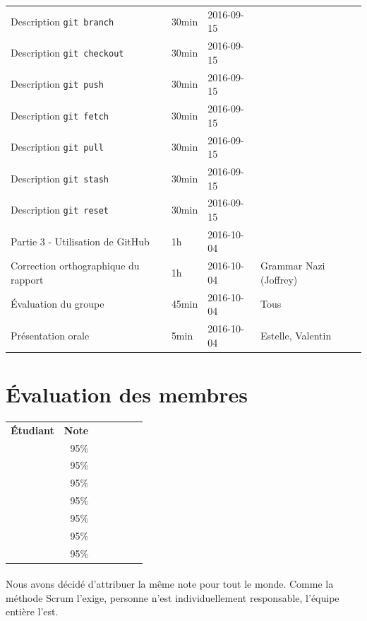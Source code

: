 \documentclass[11pt,canadien]{article}
\begin{document}
\begin{appendices}
\begin{tabular}{l l l l}
	\\ Description \texttt{git branch}      & 30min & 2016-09-15 & \karen
	\\ Description \texttt{git checkout}    & 30min & 2016-09-15 & \karen
	\\ Description \texttt{git push}        & 30min & 2016-09-15 & \kevin
	\\ Description \texttt{git fetch}       & 30min & 2016-09-15 & \kevin
	\\ Description \texttt{git pull}        & 30min & 2016-09-15 & \kevin
	\\ Description \texttt{git stash}       & 30min & 2016-09-15 & \antoine
	\\ Description \texttt{git reset}       & 30min & 2016-09-15 & \antoine
	\\ Partie 3 - Utilisation de GitHub     & 1h    & 2016-10-04 & \joffrey
	\\ Correction orthographique du rapport & 1h    & 2016-10-04 & Grammar Nazi (Joffrey)
	\\ Évaluation du groupe                 & 45min & 2016-10-04 & Tous
	\\ Présentation orale                   & 5min  & 2016-10-04 & Estelle, Valentin
\end{tabular}

\section{Évaluation des membres}
\begin{tabular}{r r r r r r r}
	\textbf{Étudiant}  & \textbf{Note} \\
	\textbf{\antoine}  & 95\%          \\
	\textbf{\estelle}  & 95\%          \\
	\textbf{\joffrey}  & 95\%          \\
	\textbf{\julien}   & 95\%          \\
	\textbf{\karen}    & 95\%          \\
	\textbf{\kevin}    & 95\%          \\
	\textbf{\valentin} & 95\%
\end{tabular}
\paragraph{}Nous avons décidé d'attribuer la même note pour tout le monde. Comme la méthode Scrum l'exige, personne n'est individuellement responsable, l'équipe entière l'est.

\end{appendices}
\end{document}
